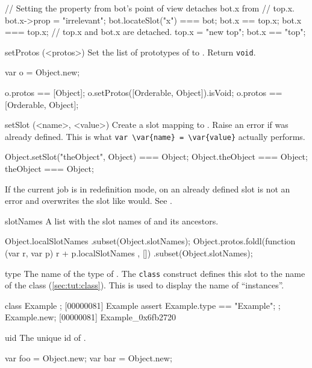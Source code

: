 \begin{urbiscriptapi}
\begin{urbiassert}
// Setting the property from bot's point of view detaches bot.x from
// top.x.
bot.x->prop = "irrelevant";
bot.locateSlot("x") === bot;
bot.x  == top.x;
bot.x === top.x;
// top.x and bot.x are detached.
top.x  = "new top";
bot.x == "top";
\end{urbiassert}

\item[setProtos](<protos>)%
  Set the list of prototypes of \this to .  Return
  \lstinline|void|.
\begin{urbiassert}
var o = Object.new;

o.protos == [Object];
o.setProtos([Orderable, Object]).isVoid;
o.protos == [Orderable, Object];
\end{urbiassert}

\item[setSlot](<name>, <value>)%
  Create a slot  mapping to . Raise an error if
   was already defined.  This is what
  \lstinline|var \var{name} = \var{value}| actually performs.
\begin{urbiassert}
Object.setSlot("theObject", Object) === Object;
Object.theObject === Object;
theObject === Object;
\end{urbiassert}

If the current job is in redefinition mode,  on an already
defined slot is not an error and overwrites the slot like
 would. See .

\item[slotNames]%
  A list with the slot names of \this and its ancestors.
\begin{urbiassert}
Object.localSlotNames
  .subset(Object.slotNames);
Object.protos.foldl(function (var r, var p) { r + p.localSlotNames },
                    [])
  .subset(Object.slotNames);
\end{urbiassert}

\item[type]%
  The name of the type of \this.  The \lstinline|class|
  construct defines this slot to the name of the class
  (\autoref{sec:tut:class}).  This is used to display the name of
  ``instances''.
\begin{urbiscript}
class Example {};
[00000081] Example
assert
{
  Example.type == "Example";
};
Example.new;
[00000081] Example_0x6fb2720
\end{urbiscript}

\item[uid]
  The unique id of \this.
\begin{urbiassert}
var foo = Object.new;
var bar = Object.new;


\end{urbiassert}
\end{urbiscriptapi}
